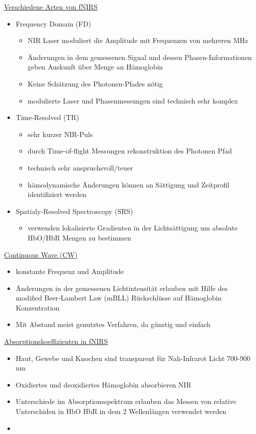 \documentclass[a4paper,10pt,oneside]{article}
\begin{document}
\underline{Verschiedene Arten von fNIRS} \\	
	\begin{itemize}
		\item Frequency Domain (FD)
			\begin{itemize}
				\item NIR Laser moduliert die Amplitude mit Frequenzen von mehreren MHz
				\item Änderungen in dem gemessenen Signal und dessen Phasen-Informationen geben Auskunft über Menge an Hämoglobin
				\item Keine Schätzung des Photonen-Pfades nötig
				\item modulierte Laser und Phasenmessungen sind technisch sehr komplex
			\end{itemize}
		\item Time-Resolved (TR)
			\begin{itemize}
				\item sehr kurzer NIR-Puls
				\item durch Time-of-flight Messungen rekonstruktion des Photonen Pfad
				\item technisch sehr anspruchsvoll/teuer
				\item hämodynamische Änderungen können an Sättigung und Zeitprofil identifiziert werden
			\end{itemize}
		\item Spatialy-Resolved Spectroscopy (SRS)
			\begin{itemize}
				\item verwenden lokalisierte Gradienten in der Lichtsättigung um absolute HbO/HbR Mengen zu bestimmen
			\end{itemize}
	\end{itemize}
 		
\underline{Continuous Wave (CW)} \\
 	\begin{itemize}
 		\item konstante Frequenz und Amplitude
 		\item Änderungen in der gemessenen Lichtintensität erlauben mit Hilfe des modified Beer-Lambert Law (mBLL) Rückschlüsse auf Hämoglobin Konzentration
 		\item Mit Abstand meist genutztes Verfahren, da günstig und einfach
 	\end{itemize}
 	
\underline{Absorptionskoeffizienten in fNIRS} \\
 	\begin{itemize}
 		\item Haut, Gewebe und Knochen sind transparent für Nah-Infrarot Licht 700-900 nm
 		\item Oxidiertes und deoxidiertes Hämoglobin absorbieren NIR
 		\item Unterschiede im Absorptionsspektrum erlauben das Messen von relative Unterschiden in HbO HbR in dem 2 Wellenlängen verwendet werden
 		\item[] %
 	\end{itemize}
 	
\end{document}
